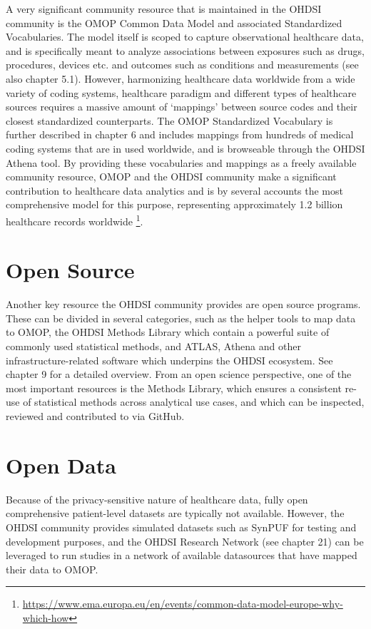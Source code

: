 \documentclass[11pt]{book}
\let\rmarkdownfootnote\footnote%
\def\footnote{\protect\rmarkdownfootnote}
\theoremstyle{definition}
\theoremstyle{definition}
\theoremstyle{definition}
\theoremstyle{remark}
\begin{document}
A very significant community resource that is maintained in the OHDSI community is the OMOP Common Data Model and associated Standardized Vocabularies. The model itself is scoped to capture observational healthcare data, and is specifically meant to analyze associations between exposures such as drugs, procedures, devices etc. and outcomes such as conditions and measurements (see also chapter 5.1). However, harmonizing healthcare data worldwide from a wide variety of coding systems, healthcare paradigm and different types of healthcare sources requires a massive amount of `mappings' between source codes and their closest standardized counterparts. The OMOP Standardized Vocabulary is further described in chapter 6 and includes mappings from hundreds of medical coding systems that are in used worldwide, and is browseable through the OHDSI Athena tool. By providing these vocabularies and mappings as a freely available community resource, OMOP and the OHDSI community make a significant contribution to healthcare data analytics and is by several accounts the most comprehensive model for this purpose, representing approximately 1.2 billion healthcare records worldwide \citep{garza_2016} \footnote{\url{https://www.ema.europa.eu/en/events/common-data-model-europe-why-which-how}}.

\hypertarget{open-source}{%
\section{Open Source}\label{open-source}}

Another key resource the OHDSI community provides are open source programs. These can be divided in several categories, such as the helper tools to map data to OMOP, the OHDSI Methods Library which contain a powerful suite of commonly used statistical methods, and ATLAS, Athena and other infrastructure-related software which underpins the OHDSI ecosystem. See chapter 9 for a detailed overview.
From an open science perspective, one of the most important resources is the Methods Library, which ensures a consistent re-use of statistical methods across analytical use cases, and which can be inspected, reviewed and contributed to via GitHub.

\hypertarget{open-data}{%
\section{Open Data}\label{open-data}}

Because of the privacy-sensitive nature of healthcare data, fully open comprehensive patient-level datasets are typically not available. However, the OHDSI community provides simulated datasets such as SynPUF for testing and development purposes, and the OHDSI Research Network (see chapter 21) can be leveraged to run studies in a network of available datasources that have mapped their data to OMOP.
\end{document}
